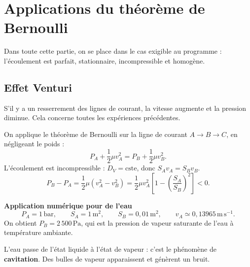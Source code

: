 \documentclass[11pt,a4paper]{article}
\newcommand{\cste}{\mathrm{cste}}
\newcommand{\venturi}{\draw[thick] (0,1)--(1.5,1)--(2.7,.3)--(4,.3)--(5.2,1)--(6.8,1);\draw[thick] (0,-1)--(1.5,-1)--(2.7,-.3)--(4,-.3)--(5.2,-1)--(6.8,-1);}
\begin{document}
\section{Applications du théorème de Bernoulli}
Dans toute cette partie, on se place dans le cas exigible au programme : l'écoulement est parfait, stationnaire, incompressible et homogène.
\subsection{Effet Venturi}
S'il y a un resserrement des lignes de courant, la vitesse augmente et la pression diminue. Cela concerne toutes les expériences précédentes.
\begin{center}\end{center}
On applique le théorème de Bernoulli sur la ligne de courant $A\to B\to C$, en négligeant le poids :
\[P_A+\frac12\mu v_A^2=P_B+\frac12\mu v_B^2.\]
L'écoulement est incompressible : $D_V=\cste$, donc $S_Av_A=S_Bv_B$.
\[P_B-P_A=\frac12\mu(v_A^2-v_B^2)=\frac12\mu v_A^2\left[1-\left(\frac{S_A}{S_B}\right)^2\right]<0.\]
\begin{exemple}[breakable]
\textbf{Application numérique pour de l'eau}
\[P_A=1\,\mathrm{bar},\qquad S_A=1\,\mathrm{m^2},\qquad S_B=0{,}01\,\mathrm{m^2},\qquad v_A\simeq0{,}13965\,\mathrm{m\,s^{-1}}.\]
On obtient $P_B=2\,500\,\mathrm{Pa}$, qui est la pression de vapeur saturante de l'eau à température ambiante.
\begin{center}\end{center}
L'eau passe de l'état liquide à l'état de vapeur : c'est le phénomène de \textbf{cavitation}. Des bulles de vapeur apparaissent et génèrent un bruit.
\end{exemple}
\end{document}
